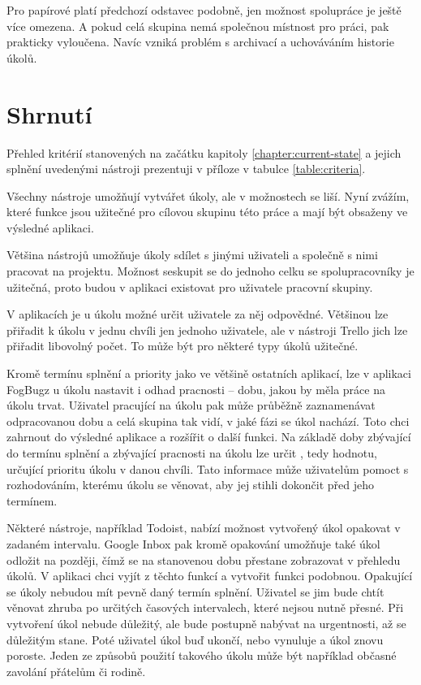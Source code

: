 \documentclass[thesis=B,czech]{FITthesis}[2012/06/26]
\begin{document}
			Pro papírové  platí předchozí odstavec podobně, jen možnost spolupráce je ještě více omezena. A pokud celá skupina nemá společnou místnost pro práci, pak prakticky vyloučena. Navíc vzniká problém s archivací a uchováváním historie úkolů.
		
	
	\section{Shrnutí}
		Přehled kritérií stanovených na začátku kapitoly \ref{chapter:current-state} a jejich splnění uvedenými nástroji prezentuji v příloze v tabulce \ref{table:criteria}.
		
		Všechny nástroje umožňují vytvářet úkoly, ale v možnostech se liší. Nyní zvážím, které funkce jsou užitečné pro cílovou skupinu této práce a mají být obsaženy ve výsledné aplikaci.
		
		Většina nástrojů umožňuje úkoly sdílet s jinými uživateli a společně s nimi pracovat na projektu. Možnost seskupit se do jednoho celku se spolupracovníky je užitečná, proto budou v aplikaci existovat pro uživatele pracovní skupiny.
		
		V aplikacích je u úkolu možné určit uživatele za něj odpovědné. Většinou lze přiřadit k úkolu v jednu chvíli jen jednoho uživatele, ale v nástroji Trello jich lze přiřadit libovolný počet. To může být pro některé typy úkolů užitečné. 
		
		Kromě termínu splnění a priority jako ve většině ostatních aplikací, lze v aplikaci FogBugz u úkolu nastavit i odhad pracnosti -- dobu, jakou by měla práce na úkolu trvat. Uživatel pracující na úkolu pak může průběžně zaznamenávat odpracovanou dobu a celá skupina tak vidí, v jaké fázi se úkol nachází. Toto chci zahrnout do výsledné aplikace a  rozšířit o další funkci. Na základě doby zbývající do termínu splnění a zbývající pracnosti na úkolu lze určit , tedy hodnotu, určující  prioritu úkolu v danou chvíli. Tato informace může uživatelům pomoct s rozhodováním, kterému úkolu se věnovat, aby jej stihli dokončit před jeho termínem.
		
		Některé nástroje, například Todoist, nabízí možnost vytvořený úkol opakovat v zadaném intervalu. Google Inbox pak kromě opakování umožňuje také úkol odložit na později, čímž se na stanovenou dobu přestane zobrazovat v přehledu úkolů. V aplikaci chci vyjít z těchto funkcí a vytvořit funkci podobnou. Opakující se úkoly nebudou mít pevně daný termín splnění. Uživatel se jim bude chtít věnovat zhruba po určitých časových intervalech, které nejsou nutně přesné. Při vytvoření úkol nebude důležitý, ale bude postupně nabývat na urgentnosti, až se důležitým stane. Poté uživatel úkol buď ukončí, nebo vynuluje a úkol znovu poroste. Jeden ze způsobů použití takového úkolu může být například občasné zavolání přátelům či rodině.
		
\end{document}
